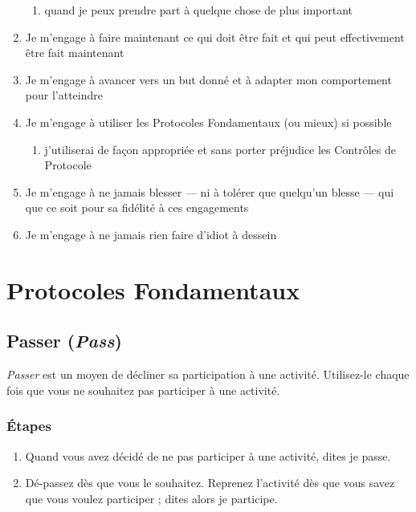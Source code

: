 \documentclass[paper=6in:9in,pagesize=pdftex,headinclude=on,footinclude=on,11pt]{scrbook}
\let\oldsection\section
\renewcommand\section{\clearpage\oldsection}
\begin{document}
\begin{enumerate}
\begin{enumerate}
		\item quand je peux prendre part à quelque chose de plus important
	\end{enumerate}
	\item Je m'engage à faire maintenant ce qui doit être fait et qui peut effectivement être fait maintenant
	\item Je m'engage à avancer vers un but donné et à adapter mon comportement pour l'atteindre
	\item Je m'engage à utiliser les Protocoles Fondamentaux (ou mieux) si possible
	\begin{enumerate}
		\item j'utiliserai de façon appropriée et sans porter préjudice les Contrôles de Protocole
	\end{enumerate}
	\item Je m'engage à ne jamais blesser --- ni à tolérer que quelqu'un blesse --- qui que ce soit pour sa fidélité à ces engagements
	\item Je m'engage à ne jamais rien faire d'idiot à dessein
\end{enumerate}

\chapter{Protocoles Fondamentaux} \label{core-protocols}

\section{Passer (\emph{Pass})} \label{protocole-passer}

\emph{Passer} est un moyen de décliner sa participation à une activité. Utilisez-le chaque fois que vous ne souhaitez pas
participer à une activité.

\subsection{Étapes}
\begin{enumerate}
	\item Quand vous avez décidé de ne pas participer à une activité, dites \og{}je passe\fg{}.
	\item \og{}Dé-passez\fg{} dès que vous le souhaitez. Reprenez l'activité dès que vous savez que vous voulez participer ;
	      dites alors \og{}je participe\fg{}.
\end{enumerate}
\end{document}
